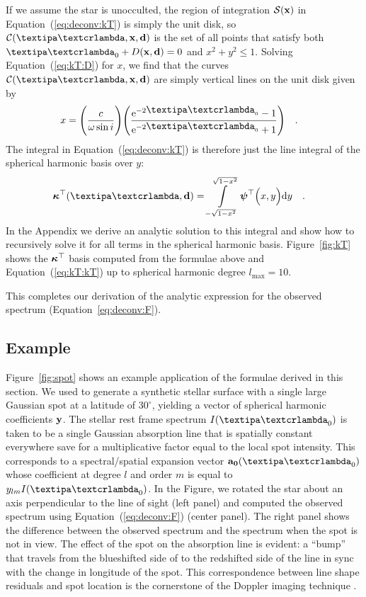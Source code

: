 \documentclass[modern]{aastex631}
\begin{document}
If we assume the star is unocculted, the region of integration $\mathcal{S}({\mathbf{x}})$ in Equation~(\ref{eq:deconv:kT}) is simply the unit disk, so $\Curve(\lnlam, \x, \Dargs)$ is the set of all points that satisfy both $\lnlam_0 + \D(\x, \Dargs) = 0$ and $x^2 + y^2 \le 1$.
Solving Equation~(\ref{eq:kT:D}) for $x$, we find that the curves $\Curve(\lnlam, \x, \Dargs)$ are simply vertical lines on the unit disk given by
%
\begin{align}
    x & =
    \Bigg(\frac{c}{\omega\sin i}\Bigg)
    \Bigg(\frac{\mathrm{e}^{-2{\lnlam_0}} - 1}
    {\mathrm{e}^{-2{\lnlam_0}} + 1}\Bigg)
    \quad .
\end{align}
%
The integral in Equation~(\ref{eq:deconv:kT}) is therefore just the line integral of the spherical harmonic basis over $y$:
%
\begin{align}
    \label{eq:kT:kT}
    \kT(\lnlam, \Dargs)
     & =
    \int\limits_{-\sqrt{1 - x^2}}^
    {\sqrt{1 - x^2}}
    \ylmbasis
    \Big(x, y\Big)
    \mathrm{d}y
    \quad .
\end{align}
%
In the Appendix we derive an analytic solution to this integral and show how to recursively solve it for all terms in the spherical harmonic basis.
Figure~\ref{fig:kT} shows the $\boldsymbol{\kappa}^\top$ basis computed from the formulae above and Equation~(\ref{eq:kT:kT}) up to spherical harmonic degree $l_\mathrm{max}=10$.

This completes our derivation of the analytic expression for the observed spectrum (Equation~\ref{eq:deconv:F}).

\subsection{Example}
%
Figure~\ref{fig:spot} shows an example application of the formulae derived in this section. 
We used \starry to generate a synthetic stellar surface with a single large Gaussian spot at a latitude of $30^\circ$, yielding a vector of spherical harmonic coefficients ${\mathbf{y}}$.
The stellar rest frame spectrum $I(\lnlam_0)$ is taken to be a single Gaussian absorption line that is spatially constant everywhere save for a multiplicative factor equal to the local spot intensity.
This corresponds to a spectral/spatial expansion vector $\azero(\lnlam_0)$ whose coefficient at degree $l$ and order $m$ is equal to $y_{lm} I(\lnlam_0)$.
In the Figure, we rotated the star about an axis perpendicular to the line of sight (left panel) and computed the observed spectrum using Equation~(\ref{eq:deconv:F}) (center panel). 
The right panel shows the difference between the observed spectrum and the spectrum when the spot is not in view.
The effect of the spot on the absorption line is evident: a ``bump'' that travels from the blueshifted side of to the redshifted side of the line in sync with the change in longitude of the spot. 
This correspondence between line shape residuals and spot location is the cornerstone of the Doppler imaging technique \citep[compare to, e.g., Figures 1 and 4 in][]{Vogt1983}.
\end{document}
